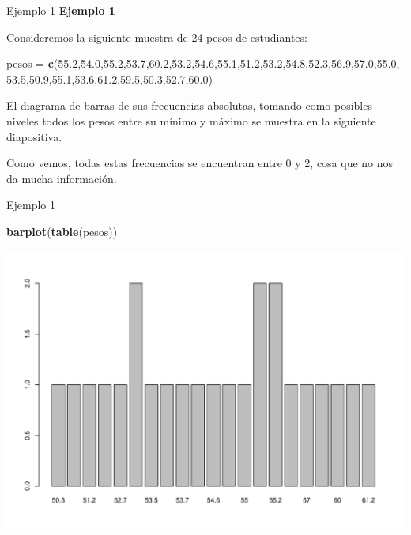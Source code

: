 \documentclass[
  ignorenonframetext,
]{beamer}
\newenvironment{Shaded}{\begin{snugshade}}{\end{snugshade}}
\newcommand{\FloatTok}[1]{\textcolor[rgb]{0.00,0.00,0.81}{#1}}
\newcommand{\FunctionTok}[1]{\textcolor[rgb]{0.13,0.29,0.53}{\textbf{#1}}}
\newcommand{\NormalTok}[1]{#1}
\newcommand{\OtherTok}[1]{\textcolor[rgb]{0.56,0.35,0.01}{#1}}
\begin{document}
\begin{frame}[fragile]{Ejemplo 1}
\label{ejemplo-1-12}
\textbf{Ejemplo 1}

Consideremos la siguiente muestra de 24 pesos de estudiantes:

\begin{Shaded}
\begin{Highlighting}[]
\NormalTok{pesos }\OtherTok{=} \FunctionTok{c}\NormalTok{(}\FloatTok{55.2}\NormalTok{,}\FloatTok{54.0}\NormalTok{,}\FloatTok{55.2}\NormalTok{,}\FloatTok{53.7}\NormalTok{,}\FloatTok{60.2}\NormalTok{,}\FloatTok{53.2}\NormalTok{,}\FloatTok{54.6}\NormalTok{,}\FloatTok{55.1}\NormalTok{,}\FloatTok{51.2}\NormalTok{,}\FloatTok{53.2}\NormalTok{,}\FloatTok{54.8}\NormalTok{,}\FloatTok{52.3}\NormalTok{,}\FloatTok{56.9}\NormalTok{,}\FloatTok{57.0}\NormalTok{,}\FloatTok{55.0}\NormalTok{,}
          \FloatTok{53.5}\NormalTok{,}\FloatTok{50.9}\NormalTok{,}\FloatTok{55.1}\NormalTok{,}\FloatTok{53.6}\NormalTok{,}\FloatTok{61.2}\NormalTok{,}\FloatTok{59.5}\NormalTok{,}\FloatTok{50.3}\NormalTok{,}\FloatTok{52.7}\NormalTok{,}\FloatTok{60.0}\NormalTok{)}
\end{Highlighting}
\end{Shaded}

El diagrama de barras de sus frecuencias absolutas, tomando como
posibles niveles todos los pesos entre su mínimo y máximo se muestra en
la siguiente diapositiva.

Como vemos, todas estas frecuencias se encuentran entre 0 y 2, cosa que
no nos da mucha información.
\end{frame}

\begin{frame}[fragile]{Ejemplo 1}
\label{ejemplo-1-13}
\begin{Shaded}
\begin{Highlighting}[]
\FunctionTok{barplot}\NormalTok{(}\FunctionTok{table}\NormalTok{(pesos))}
\end{Highlighting}
\end{Shaded}

\includegraphics[width=0.8\linewidth]{R_base_files/figure-beamer/unnamed-chunk-194-1}
\end{frame}
\end{document}
